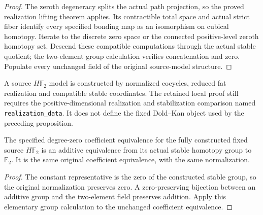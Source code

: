 \begin{proof}
  The zeroth degeneracy splits the actual path projection, so the proved realization lifting theorem applies. Its contractible total space and actual strict fiber identify every specified bonding map as an isomorphism on cubical homotopy. Iterate to the discrete zero space or the connected positive-level zeroth homotopy set. Descend these compatible computations through the actual stable quotient; the two-element group calculation verifies concatenation and zero. Populate every unchanged field of the original source-model structure.
  \leanok
\end{proof}

\begin{proposition}
  \label{prop:local-source-hf2-existence}
  \notready
  A source $H\mathbb F_2$ model is constructed by normalized cocycles,
  reduced fat realization and compatible stable coordinates. The retained
  local proof still requires the positive-dimensional realization and
  stabilization comparison named \texttt{realization\_data}. It does not
  define the fixed Dold--Kan object used by the preceding proposition.
\end{proposition}

\begin{proposition}
  \label{prop:actual-hf2-additive-recognition}
  \leanok
  The specified degree-zero coefficient equivalence for the fully constructed fixed source $H\mathbb F_2$ is an additive equivalence from its actual stable homotopy group to $\mathbb F_2$. It is the same original coefficient equivalence, with the same normalization.
\end{proposition}
\begin{proof}
  The constant representative is the zero of the constructed stable group, so the original normalization preserves zero. A zero-preserving bijection between an additive group and the two-element field preserves addition. Apply this elementary group calculation to the unchanged coefficient equivalence.
  \leanok
\end{proof}

